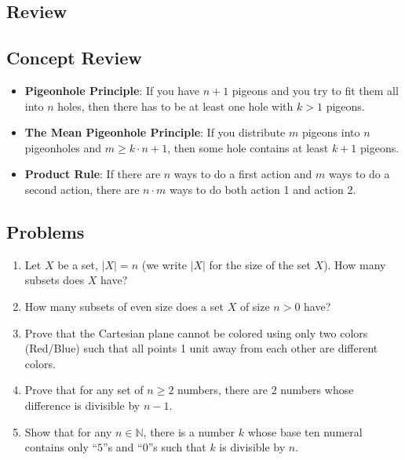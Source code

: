 \subsection{Review}
\begin{mdframed}[linewidth=1]
\section*{Concept Review}
\begin{itemize}
    \item \textbf{Pigeonhole Principle}: If you have $n + 1$ pigeons and you try to fit them all into $n$ holes, then there has to be at least one hole with $k > 1$ pigeons. 

    \item \textbf{The Mean Pigeonhole Principle}: If you distribute $m$ pigeons into $n$ pigeonholes and $m\geq k\cdot n +1$, then some hole contains at least $k+1$ pigeons. 

    \item \textbf{Product Rule}: If there are $n$ ways to do a first action and $m$ ways to do a second action, there are $n\cdot m$ ways to do both action 1 and action 2. 
\end{itemize}
\end{mdframed}


\newpage
\begin{mdframed}[linewidth=1]
\section*{Problems}
\begin{enumerate}
    \item Let $X$ be a set, $|X| = n$ (we write $|X|$ for the size of the set $X$). How many subsets does $X$ have? 

    \item How many subsets of even size does a set $X$ of size $n>0$ have?

    \item Prove that the Cartesian plane cannot be colored using only two colors (Red/Blue) such that all points 1 unit away from each other are different colors. 

    \item Prove that for any set of $n \geq 2$ numbers, there are $2$ numbers whose difference is divisible by $n - 1$. 

    \item Show that for any $n \in \mathbb{N}$, there is a number $k$ whose base ten numeral contains only ``$5$''s and ``$0$''s such that $k$ is divisible by $n$.  
\end{enumerate}
\end{mdframed}

